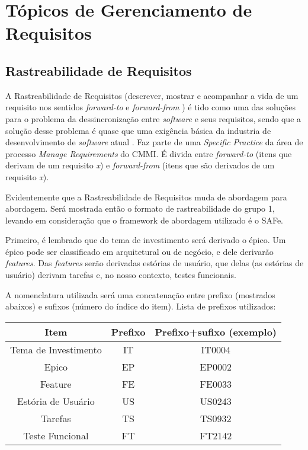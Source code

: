 
\chapter[Tópicos de Gerenciamento de Requisitos]{Tópicos de Gerenciamento de Requisitos}
\section{Rastreabilidade de Requisitos}
A Rastreabilidade de Requisitos (descrever, mostrar e acompanhar a vida de um requisito nos sentidos \emph{forward-to} e \emph{forward-from} \cite{garcia001}) é tido como uma das soluções para o problema da dessincronização entre \emph{software} e seus requisitos, sendo que a solução desse problema é quase que uma exigência básica da industria de desenvolvimento de \emph{software} atual \cite{leal001}. Faz parte de uma \emph{Specific Practice} da área de processo \emph{Manage Requirements} do CMMI. É divida entre \emph{forward-to} (itens que derivam de um requisito \emph{x}) e \emph{forward-from} (itens que são derivados de um requisito \emph{x}).

Evidentemente que a Rastreabilidade de Requisitos muda de abordagem para abordagem. Será mostrada então o formato de rastreabilidade do grupo 1, levando em consideração que o framework de abordagem utilizado é o SAFe.

Primeiro, é lembrado que do tema de investimento será derivado o épico. Um épico pode ser classificado em arquitetural ou de negócio, e dele derivarão \emph{features}. Das \emph{features} serão derivadas estórias de usuário, que delas (as estórias de usuário) derivam tarefas e, no nosso contexto, testes funcionais.

A nomenclatura utilizada será uma concatenação entre prefixo (mostrados abaixos) e sufixos (número do índice do item). Lista de prefixos utilizados:

\begin{tabular}{c | c | c}
  \hline
  Item & Prefixo & Prefixo+sufixo (exemplo)\\ \hline
  Tema de Investimento & IT & IT0004 \\
  Epico & EP & EP0002 \\
  Feature & FE & FE0033 \\
  Estória de Usuário & US & US0243 \\
  Tarefas & TS & TS0932 \\
  Teste Funcional & FT & FT2142 \\
  \hline
\end{tabular}

